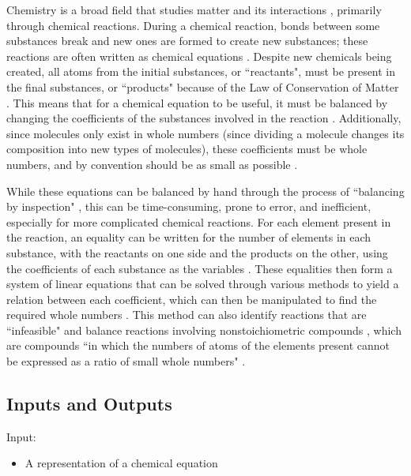 \documentclass{article}
\begin{document}
Chemistry is a broad field that studies matter and its interactions
\cite{gordon_chm101_2023}, primarily through chemical reactions.
During a chemical reaction, bonds between some substances break and new ones are
formed to create new substances; these reactions are often written as chemical
equations \cite{lund_introduction_2023}. Despite new chemicals being created,
all atoms from the initial substances, or ``reactants", must be present in the
final substances, or ``products" because of the Law of Conservation of Matter
\cite{lund_introduction_2023}. This means that for a chemical equation to be
useful, it must be balanced by changing the coefficients of the substances
involved in the reaction \cite{lund_introduction_2023}. Additionally, since
molecules only exist in whole numbers (since dividing a molecule changes its
composition into new types of molecules), these coefficients must be whole
numbers, and by convention should be as small as possible
\cite{lund_introduction_2023}.

While these equations can be balanced by hand through the process of
``balancing by inspection" \cite{lund_introduction_2023}, this can be
time-consuming, prone
to error, and inefficient, especially for more complicated chemical reactions.
For each element present in the reaction, an equality can be written for the
number of elements in each substance, with the reactants on one side and the
products on the other, using the coefficients of each substance as the
variables \cite{hamid_balancing_2019}. These equalities then form a system of
linear
equations that can be solved through various methods to yield a relation
between each coefficient, which can then be manipulated to find the required
whole
numbers \cite{lund_introduction_2023, hamid_balancing_2019}. This method can
also identify reactions that are ``infeasible" and balance reactions involving
nonstoichiometric compounds \cite{hamid_balancing_2019}, which are compounds
``in which the numbers of atoms of the elements present cannot be expressed as
a ratio of small whole numbers"
\cite{the_editors_of_encyclopaedia_britannica_nonstoichiometric_2010}.

\subsection{Inputs and Outputs} \label{io}

\noindent Input:

\begin{itemize}
	\item A representation of a chemical equation
\end{itemize}
\end{document}

